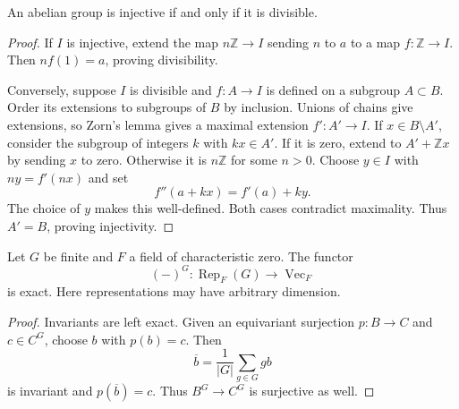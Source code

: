 \begin{proposition}
\label{proposition-divisible-injective}
An abelian group is injective if and only
if it is divisible.
\end{proposition}

\begin{proof}
If $I$ is injective, extend the map
$n\mathbb{Z}\to I$ sending $n$ to $a$
to a map $f:\mathbb{Z}\to I$. Then
$nf(1)=a$, proving divisibility.

Conversely, suppose $I$ is divisible and
$f:A\to I$ is defined on a subgroup
$A\subset B$. Order its extensions to
subgroups of $B$ by inclusion. Unions of
chains give extensions, so Zorn's lemma
gives a maximal extension $f':A'\to I$.
If $x\in B\setminus A'$, consider the
subgroup of integers $k$ with $kx\in A'$.
If it is zero, extend to $A'+\mathbb{Z}x$
by sending $x$ to zero. Otherwise it is
$n\mathbb{Z}$ for some $n>0$.
Choose $y\in I$ with $ny=f'(nx)$ and set
$$
f''(a+kx)=f'(a)+ky.
$$
The choice of $y$ makes this well-defined.
Both cases contradict maximality. Thus
$A'=B$, proving injectivity.
\end{proof}

\begin{proposition}[Averaging]
\label{proposition-invariants-averaging}
Let $G$ be finite and $F$ a field of
characteristic zero. The functor
$$
(-)^G:\operatorname{Rep}_F(G)
\to\operatorname{Vec}_F
$$
is exact. Here representations may have
arbitrary dimension.
\end{proposition}

\begin{proof}
Invariants are left exact. Given an
equivariant surjection $p:B\to C$ and
$c\in C^G$, choose $b$ with $p(b)=c$.
Then
$$
\overline b=\frac{1}{|G|}\sum_{g\in G}gb
$$
is invariant and $p(\overline b)=c$.
Thus $B^G\to C^G$ is surjective as well.
\end{proof}

